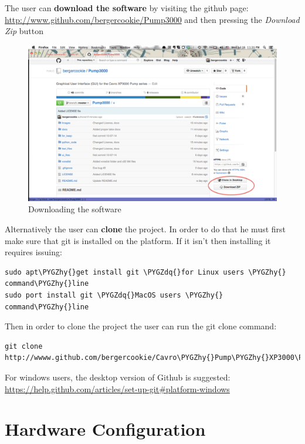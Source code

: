\documentclass[letterpaper,10pt,english]{sphinxmanual}
\def\PYGZhy{\char`\-}
\def\PYGZdq{\char`\"}
\begin{document}
The user can \textbf{download the software} by visiting the github page:
\href{http://www.github.com/bergercookie/Pump3000}{http://www.github.com/bergercookie/Pump3000} and then pressing
the \emph{Download Zip} button
\begin{figure}[htbp]
\centering
\capstart

\includegraphics{downloading.png}
\caption{Downloading the software}\label{getting-started:downloading}\end{figure}

Alternatively the user can \textbf{clone} the project. In order to do that he must first make sure that git is installed
on the platform. If it isn't then installing it requires issuing:

\begin{Verbatim}[commandchars=\\\{\}]
sudo apt\PYGZhy{}get install git \PYGZdq{}for Linux users \PYGZhy{} command\PYGZhy{}line
sudo port install git \PYGZdq{}MacOS users \PYGZhy{} command\PYGZhy{}line
\end{Verbatim}

Then in order to clone the project the user can run the git clone command:

\begin{Verbatim}[commandchars=\\\{\}]
git clone http://wwww.github.com/bergercookie/Cavro\PYGZhy{}Pump\PYGZhy{}XP3000\PYGZhy{}GUI.git
\end{Verbatim}

For windows users, the desktop version of Github is suggested:
\href{https://help.github.com/articles/set-up-git\#platform-windows}{https://help.github.com/articles/set-up-git\#platform-windows}


\section{Hardware Configuration}
\label{hardware:hardware-configuration}\label{hardware::doc}
\end{document}
